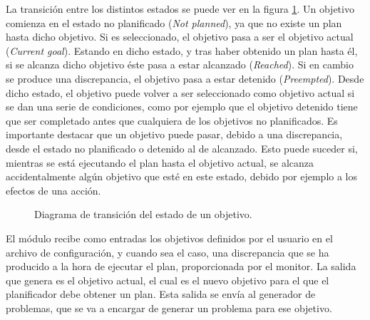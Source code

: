 La transición entre los distintos estados se puede ver en la figura \ref{fig:goal_transition}.
Un objetivo comienza en el estado no planificado (\textit{Not planned}), ya que no existe un plan
hasta dicho objetivo. Si es seleccionado, el objetivo pasa a ser el objetivo actual (\textit{Current goal}).
Estando en dicho estado, y tras haber obtenido un plan hasta él, si se alcanza dicho objetivo éste
pasa a estar alcanzado (\textit{Reached}). Si en cambio se produce una discrepancia, el objetivo pasa
a estar detenido (\textit{Preempted}). Desde dicho estado, el objetivo puede volver a ser
seleccionado como objetivo actual si se dan una serie de condiciones, como por ejemplo que
el objetivo detenido tiene que ser completado antes que cualquiera de los objetivos no planificados.
Es importante destacar que un objetivo puede pasar, debido a una discrepancia, desde el estado
no planificado o detenido al de alcanzado. Esto puede suceder si, mientras se está ejecutando el plan
hasta el objetivo actual, se alcanza accidentalmente algún objetivo que esté en este estado, debido
por ejemplo a los efectos de una acción.

\begin{figure}[H]
    \centering
    \caption{Diagrama de transición del estado de un objetivo.}
    \label{fig:goal_transition}
\end{figure}

El módulo recibe como entradas los objetivos definidos por el usuario en el archivo de configuración,
y cuando sea el caso, una discrepancia que se ha producido a la hora de ejecutar el plan, proporcionada
por el monitor. La salida que genera es el objetivo actual, el cual es el nuevo objetivo para el que
el planificador debe obtener un plan. Esta salida se envía al generador de problemas, que se va a encargar
de generar un problema para ese objetivo.

